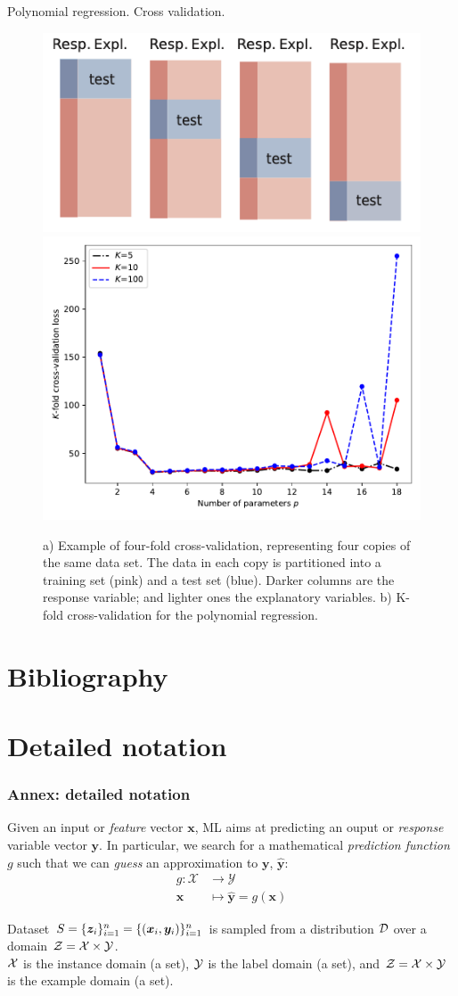 \documentclass{beamer}
\begin{document}
\begin{frame}{Polynomial regression. Cross validation.}
  \begin{figure}
    \includegraphics[width=0.4\linewidth]{crossval}
    \includegraphics[width=0.4\linewidth]{crossvalpy}
    \label{fig:crossvalpy}
    \caption{a) Example of four-fold cross-validation, representing four copies of the same data set. The data in each copy is partitioned into a training set (pink) and a test set (blue).  Darker columns are the response variable; and lighter ones the explanatory variables. b) K-fold cross-validation for the polynomial regression\cite{kroese2020}.}
  \end{figure}
\end{frame}

\section{Bibliography}



\section{Detailed notation}

\begin{frame}
  \frametitle{Annex: detailed notation}

  Given an input or {\em feature} vector $\mathbf{x}$, ML aims at predicting an ouput or {\em response} variable vector $\mathbf{y}$. In particular, we search for a mathematical {\em prediction function} $g$ such that we can {\em guess} an approximation to $\mathbf{y}$, $\hat{\mathbf{y}}$:
  \begin{align*}
      g \colon \mathcal{X}  & \rightarrow \mathcal{Y}\\
      \mathbf{x}                &\mapsto \hat{\mathbf{y}}=g(\mathbf{x})
  \end{align*}

  \begin{definition}
    Dataset  $S=\{\bm{z}_i\}_{i=1}^n=\{(\bm{x}_i,\bm{y}_i)\}_{i=1}^n$ is sampled from a distribution $\mathcal{D}$ over a domain $\mathcal{Z}=\mathcal{X}\times\mathcal{Y}$.\\
    $\mathcal{X}$  is the instance domain (a set), $\mathcal{Y}$ is the label domain (a set), and $\mathcal{Z}=\mathcal{X}\times\mathcal{Y}$ is the example domain (a set).
  \end{definition}

\end{frame}
  
\end{document}
